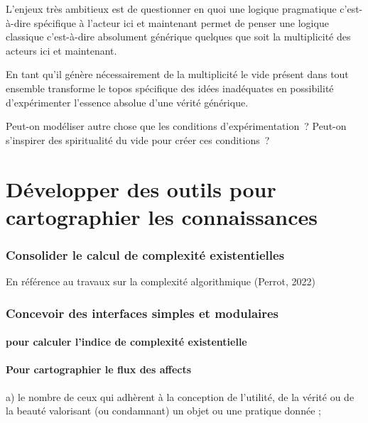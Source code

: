 \documentclass[
  a4paper,
  DIV=11,
  numbers=noendperiod]{scrreprt}
\begin{document}
L'enjeux très ambitieux est de questionner en quoi une logique
pragmatique c'est-à-dire spécifique à l'acteur ici et maintenant permet
de penser une logique classique c'est-à-dire absolument générique
quelques que soit la multiplicité des acteurs ici et maintenant.

En tant qu'il génère nécessairement de la multiplicité le vide présent
dans tout ensemble transforme le topos spécifique des idées inadéquates
en possibilité d'expérimenter l'essence absolue d'une vérité générique.

Peut-on modéliser autre chose que les conditions d'expérimentation~?
Peut-on s'inspirer des spiritualité du vide pour créer ces conditions~?

\chapter{Développer des outils pour cartographier les
connaissances}\label{sec-developper}

\subsection{Consolider le calcul de complexité
existentielles}\label{consolider-le-calcul-de-complexituxe9-existentielles}

En référence au travaux sur la complexité algorithmique (Perrot, 2022)

\subsection{Concevoir des interfaces simples et
modulaires}\label{concevoir-des-interfaces-simples-et-modulaires}

\subsubsection{pour calculer l'indice de complexité
existentielle}\label{pour-calculer-lindice-de-complexituxe9-existentielle}

\subsubsection{Pour cartographier le flux des
affects}\label{pour-cartographier-le-flux-des-affects}

a) le nombre de ceux qui adhèrent à la conception de l'utilité, de la
vérité ou de la beauté valorisant (ou condamnant) un objet ou une
pratique donnée ;
\end{document}
